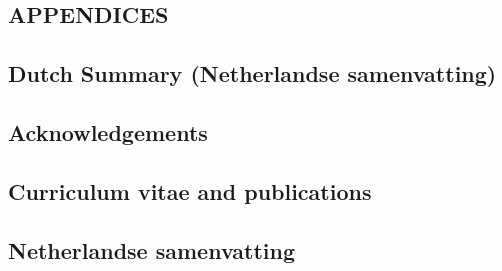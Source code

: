 \documentclass{book}
\begin{document}
\renewcommand{\thetable}{\textbf{Table \arabic{chapter}.\arabic{table}}}
\renewcommand{\thefigure}{\textbf{Figure \arabic{chapter}.\arabic{figure}}}

\begin{refsection} %

\chapter*{APPENDICES}
\section*{Dutch Summary (Netherlandse samenvatting)}
\section*{Acknowledgements}
\section*{Curriculum vitae and publications}

\clearpage
\newpage
{}
\section*{Netherlandse samenvatting}


\end{refsection}
\end{document}
